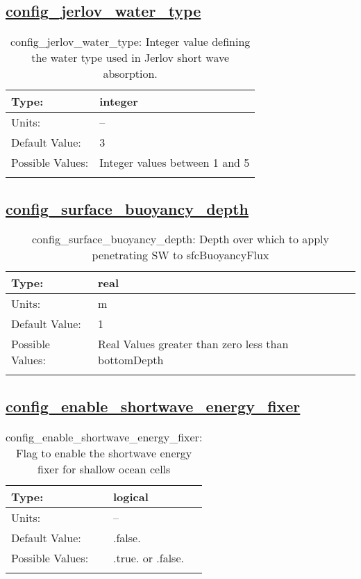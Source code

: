 \subsection[config\_jerlov\_water\_type]{\hyperref[sec:nm_tab_shortwaveRadiation]{config\_jerlov\_water\_type}}
\label{subsec:nm_sec_config_jerlov_water_type}
\begin{center}
\begin{longtable}{| p{2.0in} || p{4.0in} |}
    \hline
    Type: & integer \\
    \hline
    Units: & -- \\
    \hline
    Default Value: & 3 \\
    \hline
    Possible Values: & Integer values between 1 and 5 \\
    \hline
    \caption{config\_jerlov\_water\_type: Integer value defining the water type used in Jerlov short wave absorption.}
\end{longtable}
\end{center}
\subsection[config\_surface\_buoyancy\_depth]{\hyperref[sec:nm_tab_shortwaveRadiation]{config\_surface\_buoyancy\_depth}}
\label{subsec:nm_sec_config_surface_buoyancy_depth}
\begin{center}
\begin{longtable}{| p{2.0in} || p{4.0in} |}
    \hline
    Type: & real \\
    \hline
    Units: & \si{m} \\
    \hline
    Default Value: & 1 \\
    \hline
    Possible Values: & Real Values greater than zero less than bottomDepth \\
    \hline
    \caption{config\_surface\_buoyancy\_depth: Depth over which to apply penetrating SW to sfcBuoyancyFlux}
\end{longtable}
\end{center}
\subsection[config\_enable\_shortwave\_energy\_fixer]{\hyperref[sec:nm_tab_shortwaveRadiation]{config\_enable\_shortwave\_energy\_fixer}}
\label{subsec:nm_sec_config_enable_shortwave_energy_fixer}
\begin{center}
\begin{longtable}{| p{2.0in} || p{4.0in} |}
    \hline
    Type: & logical \\
    \hline
    Units: & -- \\
    \hline
    Default Value: & .false. \\
    \hline
    Possible Values: & .true. or .false. \\
    \hline
    \caption{config\_enable\_shortwave\_energy\_fixer: Flag to enable the shortwave energy fixer for shallow ocean cells}
\end{longtable}
\end{center}
